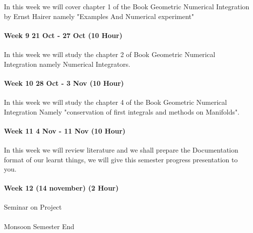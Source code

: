 \documentclass{article}
\begin{document}
In this week we will cover chapter 1 of the Book Geometric Numerical Integration by Ernst Hairer  namely "Examples And Numerical experiment" \\ \\
\textbf{Week 9 21 Oct - 27 Oct (10 Hour)} \\ \\
In this week we will study the chapter 2 of Book Geometric Numerical Integration namely Numerical Integrators.\\ \\
\textbf{Week 10 28 Oct - 3 Nov (10 Hour)}\\ \\ 
In this week we will study the chapter 4 of  the Book Geometric Numerical Integration Namely "conservation of first integrals and methods on Manifolds".\\ \\
\textbf{Week 11 4 Nov - 11 Nov (10 Hour)}\\ \\
In this week we will review literature  and we shall prepare the Documentation format of our 
learnt things, we will give this semester progress presentation to you.\\ \\
\textbf{Week 12 (14 november) (2 Hour)}\\ \\
Seminar on Project\\ \\
                                           Monsoon  Semester End
\end{document}
